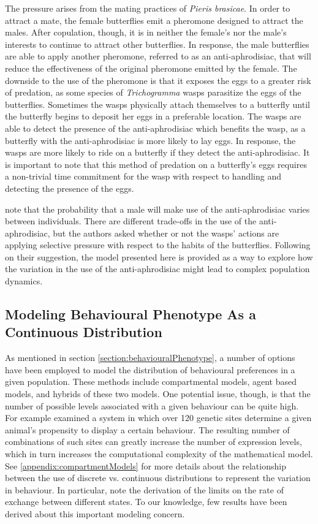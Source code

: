 \documentclass[review,authoryear]{elsarticle}
\begin{document}
The pressure arises from the mating practices of
\textit{Pieris brasicae}. In order to attract a mate, the female
butterflies  emit a pheromone designed to attract the males. After copulation, though, it is in neither the
female's nor the male's interests to continue to attract other
butterflies. In response, the male butterflies are able to
apply another pheromone, referred to as an anti-aphrodisiac, that will
reduce the effectiveness of the original pheromone emitted by the
female.
The downside to the use of the pheromone is that it exposes the eggs
to a greater risk of predation, as some species of \textit{Trichogramma}
wasps parasitize the eggs of the butterflies. Sometimes the wasps
physically attach themselves to a butterfly until the
butterfly begins to deposit her eggs in a preferable location. The
wasps are able to detect the presence of the anti-aphrodisiac which benefits the wasp, as a butterfly with the
anti-aphrodisiac is more likely to lay eggs. In response, the wasps
are more likely to ride on a butterfly if they detect the
anti-aphrodisiac. It is important to note that this method of predation on
a butterfly's eggs requires a non-trivial time commitment for the wasp with 
respect to handling and detecting the presence of the eggs.

\cite{10.1093/beheco/arq007} note that the probability that
a male will make use of the anti-aphrodisiac varies between
individuals. There are different trade-offs in the use of the
anti-aphrodisiac, but the authors asked whether or not the wasps' actions are
applying selective pressure with respect to the habits of
the butterflies. 
Following on their suggestion, the model presented here is provided as a way to explore how the variation in the use of the anti-aphrodisiac might lead to complex population dynamics.

\subsection{Modeling Behavioural Phenotype As a Continuous
  Distribution}

As mentioned in section \ref{section:behaviouralPhenotype}, a number
of options have been employed to model the distribution of behavioural
preferences in a given population. These methods include compartmental
models, agent based models, and hybrids of these two models. One
potential issue, though, is that the number of possible levels associated with a given behaviour can be quite
high. For example \cite{doi:10.1111/mec.14878} examined a system in
which over 120 genetic sites determine a given animal's 
propensity to display a certain behaviour. The resulting number of
combinations of such sites can greatly increase the number of expression levels, which in turn increases the computational complexity of the mathematical model. See  \ref{appendix:compartmentModels} for more details about the relationship between the use of discrete vs. continuous distributions to represent the variation in behaviour. In particular, note the derivation of the limits on the rate of exchange between different states. To our knowledge, few results have been derived about this important modeling concern.
\end{document}
